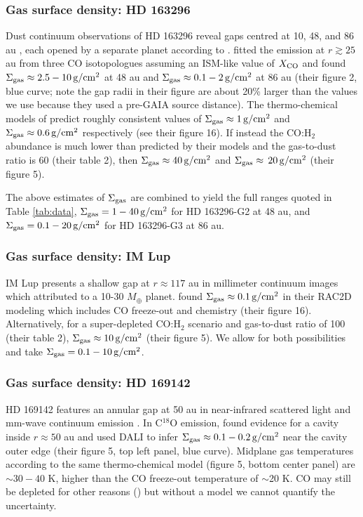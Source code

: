 \documentclass[fleqn,usenatbib]{mnras}
\newcommand{\Mearth}{M_{\oplus}}
\newcommand{\Sigg}{\Sigma_{\rm gas}}
\newcommand{\gcm}{\rm g/cm^2}
\begin{document}
\subsubsection{Gas surface density: HD 163296}
\label{subsubsec:sigg_isella}


Dust continuum observations of HD 163296 reveal gaps centred at 10, 48, and 86 au \citep{isella_etal_2016, huang_etal_2018}, each opened by a separate planet according to \cite{zhang_etal_2018}. 
\cite{isella_etal_2016} fitted the emission at $r \gtrsim 25$ au from three CO isotopologues
assuming an ISM-like value of $X_{\rm CO}$ and found $\Sigg \approx 2.5-10\,\gcm$ at 48 au and $\Sigg \approx 0.1-2 \,\gcm$ at 86 au (their figure 2, blue curve; note the gap radii in their figure are about 20\% larger than the values we use because they used a pre-GAIA source distance). The thermo-chemical models of \cite{zhang_etal_2021} predict roughly consistent values of $\Sigg \approx 1 \,\gcm$ and $\Sigg \approx 0.6 \,\gcm$ respectively (see their figure 16). If instead the CO:H$_2$ abundance is much lower than predicted by their models and the gas-to-dust ratio is $60$ (their table 2), then  $\Sigg \approx 40\,\gcm$ and $\Sigg \approx \, 20\, \gcm$ (their figure 5).

The above estimates of $\Sigg$ are combined to yield the full ranges quoted in Table \ref{tab:data}, $\Sigg = 1-40\,\gcm$ for HD 163296-G2 at 48 au, and $\Sigg = 0.1-20\,\gcm$ for HD 163296-G3 at 86 au.


\subsubsection{Gas surface density: IM Lup}
\label{subsubsec:sigg_IMLup}
IM Lup presents a shallow gap at $r \approx 117$ au in millimeter continuum images \citep{huang_etal_2018} which \cite{zhang_etal_2018} attributed to a 10-30 $\Mearth$ planet.
\cite{zhang_etal_2021} found $\Sigg \approx 0.1 \,\gcm$ in their RAC2D modeling which includes CO freeze-out and chemistry (their figure 16). Alternatively, for a super-depleted CO:H$_2$ scenario and gas-to-dust ratio of 100 (their table 2), $\Sigg \approx 10\,\gcm$ (their figure 5). We allow for both possibilities and take $\Sigg = 0.1-10\,\gcm$.


\subsubsection{Gas surface density: HD 169142}
\label{subsubsec:sigg_fedele}
HD 169142 features an annular gap at 50 au in near-infrared scattered light \citep{quanz_etal_2013} and mm-wave continuum emission \citep{fedele_etal_2017}. In C$^{18}$O emission, \citet{fedele_etal_2017} 
found evidence for a cavity inside $r \approx 50$ au and used DALI to infer $\Sigg \approx 0.1-0.2\,\gcm$ near the cavity outer edge (their figure 5, top left panel, blue curve). 
Midplane gas temperatures according to the same thermo-chemical model (figure 5, bottom center panel) are $\sim$$30-40$ K, higher than the CO freeze-out temperature of $\sim$20 K. CO may still be depleted for other reasons  (\citealt{schwarz_etal_2018})
but without a model we cannot quantify the uncertainty.
\end{document}
